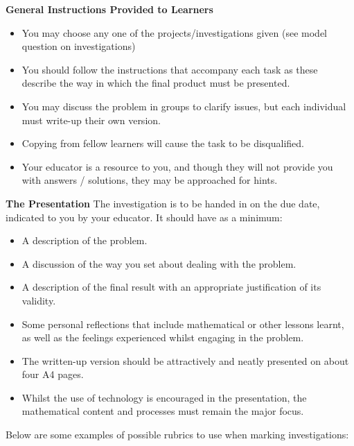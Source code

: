 \textbf{General Instructions Provided to Learners}
\begin{itemize}[noitemsep]
\item You may choose any one of the projects/investigations given (see model question on investigations)
\item You should follow the instructions that accompany each task as these describe the way in which the final product must be presented.
\item You may discuss the problem in groups to clarify issues, but each individual must write-up their own version.
\item Copying from fellow learners will cause the task to be disqualified.
\item Your educator is a resource to you, and though they will not provide you with answers / solutions, they may be approached for hints.
	\end{itemize}	
\textbf{The Presentation}
The investigation is to be handed in on the due date, indicated to you by your educator. It should have as a minimum:
\begin{itemize}[noitemsep]
\item A description of the problem.
\item A discussion of the way you set about dealing with the problem.
\item A description of the final result with an appropriate justification of its validity.
\item Some personal reflections that include mathematical or other lessons learnt, as well as the feelings experienced whilst engaging in the problem.
\item The written-up version should be attractively and neatly presented on about four A4 pages.
\item Whilst the use of technology is encouraged in the presentation, the mathematical content and processes must remain the major focus.
\end{itemize}	
Below are some examples of possible rubrics to use when marking investigations:\par

